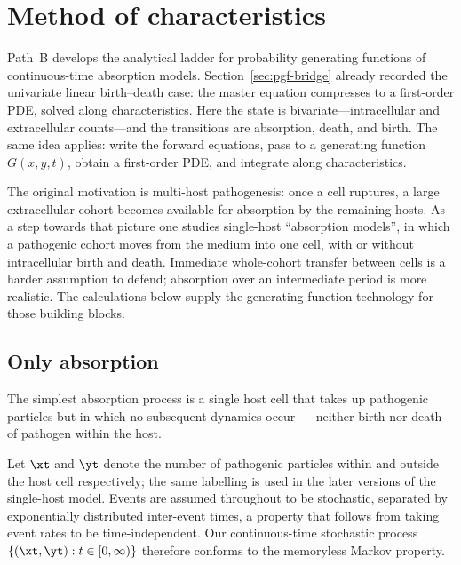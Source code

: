 \section{Method of characteristics}
\label{sec:moc}

Path~B develops the analytical ladder for probability generating functions of continuous-time absorption models. Section~\ref{sec:pgf-bridge} already recorded the univariate linear birth--death case: the master equation compresses to a first-order PDE, solved along characteristics. Here the state is bivariate---intracellular and extracellular counts---and the transitions are absorption, death, and birth. The same idea applies: write the forward equations, pass to a generating function $G(x,y,t)$, obtain a first-order PDE, and integrate along characteristics.

The original motivation is multi-host pathogenesis: once a cell ruptures, a large extracellular cohort becomes available for absorption by the remaining hosts. As a step towards that picture one studies single-host ``absorption models'', in which a pathogenic cohort moves from the medium into one cell, with or without intracellular birth and death. Immediate whole-cohort transfer between cells is a harder assumption to defend; absorption over an intermediate period is more realistic. The calculations below supply the generating-function technology for those building blocks.

\subsection{Only absorption}
The simplest absorption process is a single host cell that takes up pathogenic particles but in which no subsequent dynamics occur --- neither birth nor death of pathogen within the host.

Let $\xt$ and $\yt$ denote the number of pathogenic particles within and outside the host cell respectively; the same labelling is used in the later versions of the single-host model. Events are assumed throughout to be stochastic, separated by exponentially distributed inter-event times, a property that follows from taking event rates to be time-independent. Our continuous-time stochastic process $\{(\xt, \yt) : t\in[0,\infty)\}$ therefore conforms to the memoryless Markov property.

